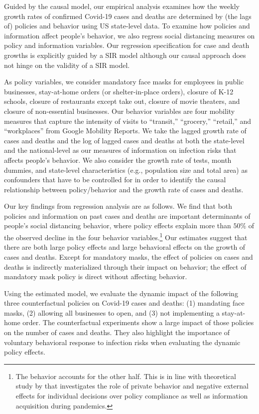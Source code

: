 \documentclass[11pt,reqno,letter]{amsart}
\theoremstyle{definition}
\begin{document}
Guided by the causal model, our empirical analysis examines how the weekly growth rates of confirmed Covid-19 cases and deaths are determined by (the lags of) policies and behavior using US state-level data. To examine how policies and information affect people's behavior, we also regress social distancing measures  on policy and information variables. Our regression specification for case and death growths is explicitly guided by a SIR model although  our causal approach does not hinge on the validity of a SIR model.


As policy variables, we consider  mandatory face masks for employees in public businesses, stay-at-home orders (or shelter-in-place orders), closure of K-12 schools, closure of restaurants except take out, closure of movie theaters, and closure of non-essential businesses. Our behavior variables are four mobility measures that capture the intensity of visits to ``transit,'' ``grocery,'' ``retail,'' and ``workplaces''  from Google Mobility Reports. We take the lagged growth rate of cases and deaths and the log of lagged cases and deaths at both the state-level and the national-level as our measures of information on infection risks that affects people's  behavior. We also consider the growth rate of tests, month dummies, and state-level characteristics (e.g., population size and total area) as confounders that have to be controlled for in order to identify the causal relationship between policy/behavior and the growth rate of cases and deaths.

Our key findings from regression analysis are as follows.  We find
that both policies and information on past cases and deaths are important
determinants of people's social distancing behavior, where policy
effects explain more than $50\%$ of the observed decline in the four
behavior variables.\footnote{The behavior accounts for the other half. This is in line with theoretical study by \cite{gitmez2020} that investigates the role of private behavior and
negative external effects for individual decisions over policy compliance as well as information acquisition during pandemics.} Our estimates suggest that there are both large policy effects and large behavioral effects on the growth of cases and deaths. Except for mandatory masks, the effect of policies on cases and deaths is indirectly materialized through their impact on behavior; the effect of mandatory mask policy is direct without affecting behavior.


Using the estimated model, we evaluate the dynamic impact of the following three counterfactual policies on Covid-19 cases and deaths: (1) mandating face masks, (2)  allowing all businesses to open, and (3) not implementing a stay-at-home order.  The counterfactual experiments show a large impact of  those policies on  the number of cases and deaths.  They also highlight the importance of voluntary behavioral response to infection risks when evaluating the dynamic policy effects.
 
\end{document}
